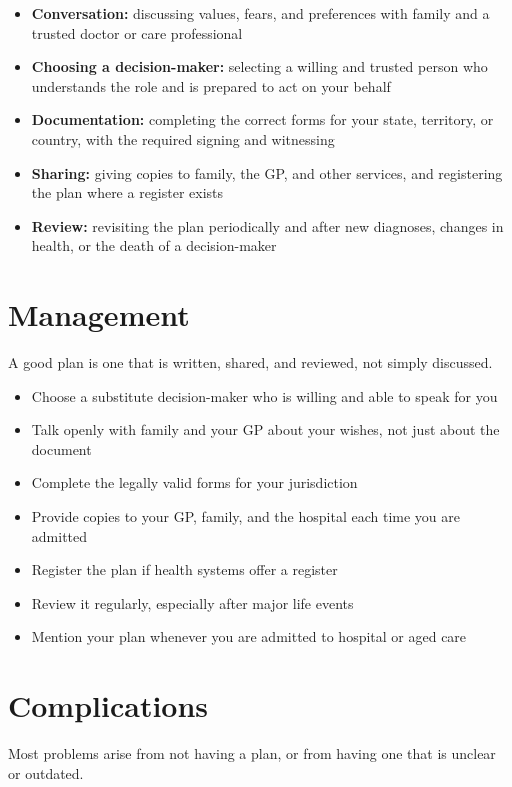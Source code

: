 \begin{itemize}
    \item \textbf{Conversation:} discussing values, fears, and preferences with family and a trusted doctor or care professional
    \item \textbf{Choosing a decision-maker:} selecting a willing and trusted person who understands the role and is prepared to act on your behalf
    \item \textbf{Documentation:} completing the correct forms for your state, territory, or country, with the required signing and witnessing
    \item \textbf{Sharing:} giving copies to family, the GP, and other services, and registering the plan where a register exists
    \item \textbf{Review:} revisiting the plan periodically and after new diagnoses, changes in health, or the death of a decision-maker
\end{itemize}

\section*{Management}
A good plan is one that is written, shared, and reviewed, not simply discussed.

\begin{itemize}
    \item Choose a substitute decision-maker who is willing and able to speak for you
    \item Talk openly with family and your GP about your wishes, not just about the document
    \item Complete the legally valid forms for your jurisdiction
    \item Provide copies to your GP, family, and the hospital each time you are admitted
    \item Register the plan if health systems offer a register
    \item Review it regularly, especially after major life events
    \item Mention your plan whenever you are admitted to hospital or aged care
\end{itemize}

\section*{Complications}
Most problems arise from not having a plan, or from having one that is unclear or outdated.

